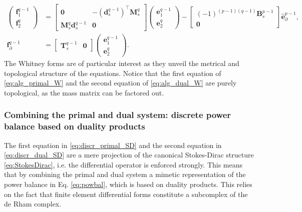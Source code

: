 \documentclass{elsarticle}
\newcommand*{\dual}[1]{\ensuremath{\widehat{#1}}}
\begin{document}
{\begin{equation}
\begin{aligned}
    \begin{pmatrix}
    \mathbf{f}^{q-1}_1 \\
    \mathbf{f}^q_2
    \end{pmatrix} &=
    \begin{bmatrix}
        \mathbf{0} & -(\mathbf{d}_s^{q-1})^\top \mathbf{M}^q_s\\
        \mathbf{M}^q_s \mathbf{d}^{q-1}_s & \mathbf{0}
    \end{bmatrix}
    \begin{pmatrix}
    \mathbf{e}^{q-1}_1 \\
    \mathbf{e}^q_2
    \end{pmatrix} - 
    \begin{bmatrix}
        (-1)^{(p-1)(q-1)}\mathbf{B}_s^{p-1}\\
        \mathbf{0}
    \end{bmatrix}\dual{\mathbf{e}}^{p-1}_\partial, \\
    \mathbf{f}_\partial^{q-1} &= \begin{bmatrix}
        \mathbf{T}_s^{q-1} & \mathbf{0}
    \end{bmatrix}\begin{pmatrix}
    \mathbf{e}^{q-1}_1 \\
    \mathbf{e}^q_2
    \end{pmatrix}.
\end{aligned}
\end{equation}
The Whitney forms are of particular interest as they unveil the metrical and topological structure of the equations. Notice that the first equation of \eqref{eq:alg_primal_W} and the second equation of \eqref{eq:alg_dual_W} are purely topological, as the mass matrix can be factored out. 


\subsubsection{Combining the primal and dual system: discrete power balance based on duality products}
The first equation in \eqref{eq:discr_primal_SD} and the second equation in \eqref{eq:discr_dual_SD} are a mere projection of the canonical Stokes-Dirac structure \eqref{eq:StokesDirac}, i.e. the differential operator is enforced strongly. This means that by combining the primal and dual system a mimetic representation of the power balance in Eq. \eqref{eq:powbal}, which is based on duality products. This relies on the fact that finite element differential forms constitute a subcomplex of the de Rham complex.

}
\end{document}
